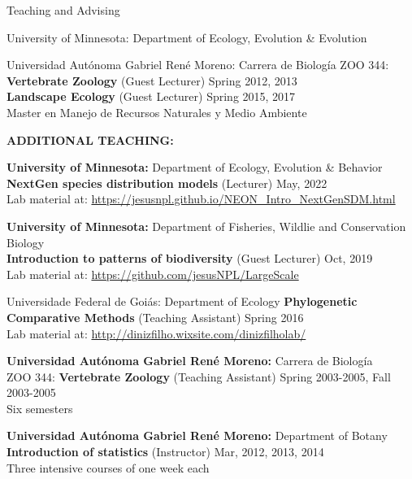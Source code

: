 \documentclass{resume} %
\begin{document}
\begin{rSection}{Teaching and Advising}
\begin{reSubsection}{University of Minnesota: }{Department of Ecology, Evolution \& Evolution }{}
{}

\end{reSubsection}

\begin{reSubsection}{Universidad Autónoma Gabriel René Moreno: }{Carrera de Biología }{}{
ZOO 344: \textbf{Vertebrate Zoology} (Guest Lecturer) \hfill Spring 2012, 2013 \\ \textbf{Landscape Ecology} (Guest Lecturer) \hfill Spring 2015, 2017 \\
{Master en Manejo de Recursos Naturales y Medio Ambiente} \smallskip 
} 
\end{reSubsection}


\textbf{ADDITIONAL TEACHING:}

{\bf University of Minnesota: }{Department of Ecology, Evolution \& Behavior } \\
\textbf{NextGen species distribution models} (Lecturer) \hfill May, 2022 \\
{Lab material at:
\url{https://jesusnpl.github.io/NEON_Intro_NextGenSDM.html}}\smallskip 

{\bf University of Minnesota: }{Department of Fisheries, Wildlie and Conservation Biology } \\
\textbf{Introduction to patterns of biodiversity} (Guest Lecturer) \hfill Oct, 2019 \\
{Lab material at:
\url{https://github.com/jesusNPL/LargeScale}}\smallskip 

\begin{reSubsection}{Universidade Federal de Goiás: }{Department of Ecology }{}{
\textbf{Phylogenetic Comparative Methods} (Teaching Assistant) \hfill Spring 2016 \\ 
{Lab material at:
\url{http://dinizfilho.wixsite.com/dinizfilholab/}} \smallskip 
} 
\end{reSubsection}

{\bf Universidad Autónoma Gabriel René Moreno: }{Carrera de Biología } \\
ZOO 344: \textbf{Vertebrate Zoology} (Teaching Assistant) \hfill Spring 2003-2005, Fall 2003-2005 \\
{Six semesters}\smallskip 

{\bf Universidad Autónoma Gabriel René Moreno: }{Department of Botany } \\
\textbf{Introduction of statistics} (Instructor) \hfill Mar, 2012, 2013, 2014 \\
{Three intensive courses of one week each}\smallskip 


\end{rSection}
\end{document}

